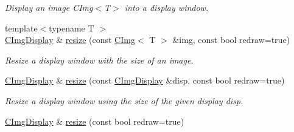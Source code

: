 \begin{DoxyCompactItemize}
\begin{DoxyCompactList}\small\item\em Display an image CImg$<$T$>$ into a display window. \item\end{DoxyCompactList}\item 
{\footnotesize template$<$typename T $>$ }\\\hyperlink{structcimg__library_1_1_c_img_display}{CImgDisplay} \& \hyperlink{structcimg__library_1_1_c_img_display_a25e253a193c8ce726fe3af3fdddb62a5}{resize} (const \hyperlink{structcimg__library_1_1_c_img}{CImg}$<$ T $>$ \&img, const bool redraw=true)
\begin{DoxyCompactList}\small\item\em Resize a display window with the size of an image. \item\end{DoxyCompactList}\item 
\hypertarget{structcimg__library_1_1_c_img_display_ac30fbf27d5d132fc45e51c56d8dd6271}{
\hyperlink{structcimg__library_1_1_c_img_display}{CImgDisplay} \& \hyperlink{structcimg__library_1_1_c_img_display_ac30fbf27d5d132fc45e51c56d8dd6271}{resize} (const \hyperlink{structcimg__library_1_1_c_img_display}{CImgDisplay} \&disp, const bool redraw=true)}
\label{structcimg__library_1_1_c_img_display_ac30fbf27d5d132fc45e51c56d8dd6271}

\begin{DoxyCompactList}\small\item\em Resize a display window using the size of the given display {\ttfamily disp}. \item\end{DoxyCompactList}\item 
\hypertarget{structcimg__library_1_1_c_img_display_adb8b42ca0e236a43bd030252b75a274c}{
\hyperlink{structcimg__library_1_1_c_img_display}{CImgDisplay} \& \hyperlink{structcimg__library_1_1_c_img_display_adb8b42ca0e236a43bd030252b75a274c}{resize} (const bool redraw=true)}
\label{structcimg__library_1_1_c_img_display_adb8b42ca0e236a43bd030252b75a274c}


\end{DoxyCompactItemize}
